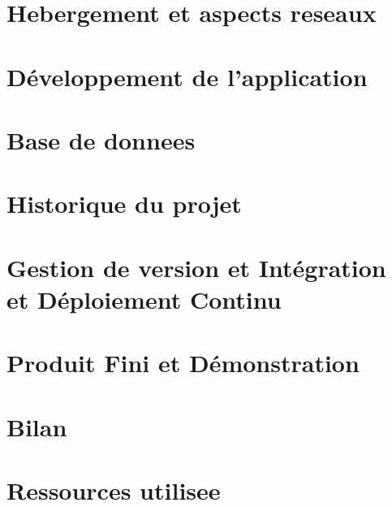\documentclass[12pt, a4paper, oneside]{article}
\begin{document}
    \section{Hebergement et aspects reseaux}\label{sec:hebergement-et-aspects-reseaux}
    \newpage


    \section{Développement de l'application}\label{sec:developpement-de-l'application}
    \newpage


    \section{Base de donnees}\label{sec:base-de-donnees}
    
    \newpage


    \section{Historique du projet}\label{sec:historique-du-projet}
    
    \newpage


    \section{Gestion de version et Intégration et Déploiement Continu}\label{sec:gestion-de-version-et-integration/-deploiement-continu}
    
    \newpage


    \section{Produit Fini et Démonstration}\label{sec:produit-fini-et-demonstration}
    
    \newpage


    \section{Bilan}\label{sec:bilan}
    
    \newpage


    \section{Ressources utilisee}\label{sec:ressources-utilisee}
    
    \newpage
\end{document}
